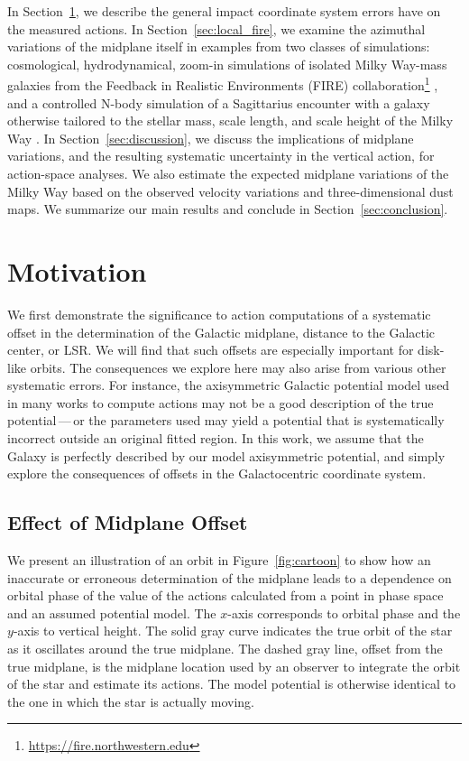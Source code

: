 \documentclass[twocolumn]{aastex62}
\begin{document}
In Section~\ref{sec:ref_frame}, we describe the general impact coordinate
system errors have on the measured actions. In Section~\ref{sec:local_fire},
we examine the azimuthal variations of the midplane itself in examples from
two classes of simulations: cosmological, hydrodynamical, zoom-in simulations
of isolated Milky Way-mass galaxies from the Feedback in Realistic
Environments (FIRE)
collaboration\footnote{\url{https://fire.northwestern.edu}}
\citep{2014MNRAS.445..581H, 2016ApJ...827L..23W, 2018MNRAS.480..800H}, and a
controlled N-body simulation of a Sagittarius encounter with a galaxy
otherwise tailored to the stellar mass, scale length, and scale height of the
Milky Way \citep{2018MNRAS.481..286L}. In Section~\ref{sec:discussion}, we
discuss the implications of midplane variations, and the resulting systematic
uncertainty in the vertical action, for action-space analyses. We also
estimate the expected midplane variations of the Milky Way based on the
observed velocity variations and three-dimensional dust maps. We summarize our
main results and conclude in Section~\ref{sec:conclusion}.

\section{Motivation} \label{sec:ref_frame}
We first demonstrate the significance to action computations of a systematic
offset in the determination of the Galactic midplane, distance to the Galactic
center, or LSR. We will find that such offsets are especially important for
disk-like orbits. The consequences we explore here may also arise from various
other systematic errors. For instance, the axisymmetric Galactic potential
model used in many works to compute actions may not be a good description of
the true potential\,---\,or the parameters used may yield a potential that is
systematically incorrect outside an original fitted region. In this work, we
assume that the Galaxy is perfectly described by our model axisymmetric
potential, and simply explore the consequences of offsets in the
Galactocentric coordinate system.

\subsection{Effect of Midplane Offset} \label{ssec:cartoon}
We present an illustration of an orbit in Figure~\ref{fig:cartoon} to show how
an inaccurate or erroneous determination of the midplane leads to a dependence
on orbital phase of the value of the actions calculated from a point in phase
space and an assumed potential model. The $x$-axis corresponds to orbital
phase and the $y$-axis to vertical height. The solid gray curve indicates the
true orbit of the star as it oscillates around the true midplane. The dashed
gray line, offset from the true midplane, is the midplane location used by an
observer to integrate the orbit of the star and estimate its actions. The
model potential is otherwise identical to the one in which the star is
actually moving.
\end{document}
